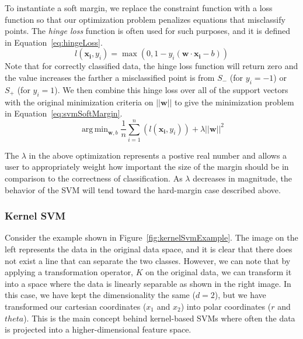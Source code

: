 \documentclass[12pt]{article}
\DeclareMathOperator*{\argmin}{arg\,min}
\begin{document}
To instantiate a soft margin, we replace the constraint function with a loss
function so that our optimization problem penalizes equations that misclassify
points.
%
The \emph{hinge loss} function is often used for such purposes, and it is
defined in Equation~\ref{eq:hingeLoss}.
%
\begin{equation}
l(\mathbf{x_i},y_i) = \max(0,1-y_i(\mathbf{w} \cdot \mathbf{x_i} - b))
\label{eq:hingeLoss}
\end{equation}
%
Note that for correctly classified data, the hinge loss function will return
zero and the value increases the farther a misclassified point is from $S_-$
(for $y_i=-1$) or $S_+$ (for $y_i=1$).
%
We then combine this hinge loss over all of the support vectors with the
original minimization criteria on $||\mathbf{w}||$ to give the minimization
problem in Equation~\ref{eq:svmSoftMargin}.
\begin{equation}
\argmin_{\mathbf{w},b}\frac{1}{n}\sum_{i=1}^n \left(l(\mathbf{x_i},y_i)\right) +
\lambda ||\mathbf{w}||^2
\label{eq:svmSoftMargin}
\end{equation}

The $\lambda$ in the above optimization represents a postive real number and
allows a user to appropriately weight how important the size of the margin
should be in comparison to the correctness of classification.
%
As $\lambda$ decreases in magnitude, the behavior of the SVM will tend toward
the hard-margin case described above.

\subsubsection{Kernel SVM}

Consider the example shown in Figure~\ref{fig:kernelSvmExample}.
%
The image on the left represents the data in the original data space, and it is
clear that there does not exist a line that can separate the two classes.
%
However, we can note that by applying a transformation operator, $K$ on the
original data, we can transform it into a space where the data is linearly
separable as shown in the right image.
%
In this case, we have kept the dimensionality the same ($d=2$), but we have
transformed our cartesian coordinates ($x_1$ and $x_2$) into polar coordinates
($r$ and $theta$).
%
This is the main concept behind kernel-based SVMs where often the data is
projected into a higher-dimensional feature space.
\end{document}
